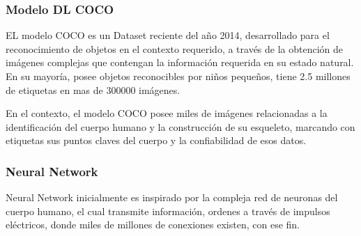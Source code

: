 \subsubsection{Modelo DL COCO}

EL modelo COCO es un Dataset reciente del año 2014, desarrollado para el reconocimiento de objetos en el contexto requerido, a través de la obtención de imágenes complejas que contengan la información requerida en su estado natural.
En su mayoría, posee objetos reconocibles por niños pequeños, tiene 2.5 millones de etiquetas en mas de 300000 imágenes.

En el contexto, el modelo COCO posee miles de imágenes relacionadas a la identificación del cuerpo humano y la construcción de su esqueleto, marcando con etiquetas sus puntos claves del cuerpo y la confiabilidad de esos datos\cite{lin2014microsoft}.

\subsubsection{Neural Network}

Neural Network inicialmente es inspirado por la compleja red de neuronas del cuerpo humano, el cual transmite información, ordenes a través de impulsos eléctricos, donde miles de millones de conexiones existen, con ese fin\cite{wang2003artificial}. 
\\

